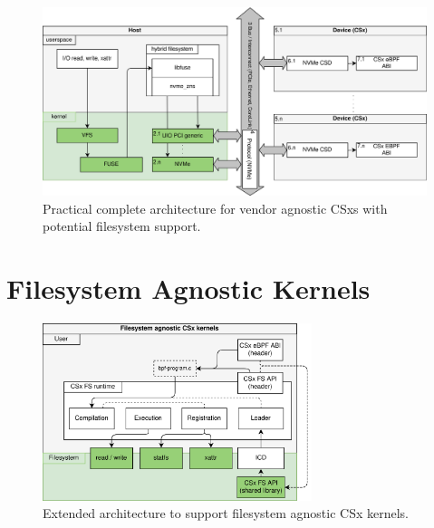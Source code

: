 \begin{figure}
    \centering
	\includegraphics[width=1\textwidth]{resources/images/loader-pfs-arch-v3.png}
	\caption{Practical complete architecture for vendor agnostic CSxs with
        potential filesystem support.}
    \label{figure:practicalarchitecture}
\end{figure}

\section{Filesystem Agnostic Kernels}



\begin{figure}
    \centering
	\includegraphics[width=0.7\textwidth]{resources/images/csx-fs-agnostic.png}
	\caption{Extended architecture to support filesystem agnostic CSx kernels.}
    \label{figure:csxfsruntime}
\end{figure}

